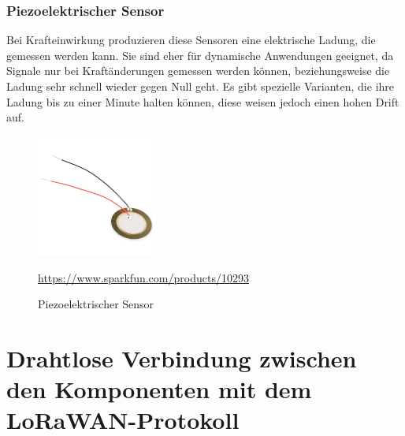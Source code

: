 \subsection{Piezoelektrischer Sensor}
Bei Krafteinwirkung produzieren diese Sensoren eine elektrische Ladung, die gemessen werden kann. Sie sind eher für dynamische Anwendungen geeignet, da Signale nur bei Kraftänderungen gemessen werden können, beziehungsweise die Ladung sehr schnell wieder gegen Null geht. Es gibt spezielle Varianten, die ihre Ladung bis zu einer Minute halten können, diese weisen jedoch einen hohen Drift auf. 
\begin{figure}[H]
    \center
    \includegraphics[width=4cm]{Bilder/waegezelle-ring.png}\\
    \caption{Piezoelektrischer Sensor}
    \begin{center} \quelle\url{https://www.sparkfun.com/products/10293} \end{center}
\end{figure}

\chapter{Drahtlose Verbindung zwischen den Komponenten mit dem LoRaWAN-Protokoll}
